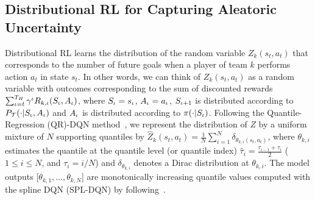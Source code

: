\documentclass{article}
\newcommand{\horizon}{T_{H}}
\newcommand{\state}{s}
\newcommand{\action}{a}
\newcommand{\transition}{t}
\newcommand{\reward}{r}
\newcommand{\agentIndex}{k}
\newcommand{\quantielIndex}{i}
\begin{document}
\subsection{Distributional RL for Capturing Aleatoric Uncertainty}\label{subsec:aleatoric-uncertainty}
Distributional RL learns the distribution of the random variable $Z_{\agentIndex}(\state_{t},\action_{t})$ that 
corresponds to the number of future goals when a player of team $k$ performs action $\action_{t}$ in state $\state_{t}$.  In other words, we can think of $Z_{\agentIndex}(\state_{t},\action_{t})$ as a random variable with outcomes corresponding to the sum of discounted rewards $\sum_{\iota=t}^{\horizon}\gamma^{\iota}\MakeUppercase{R}_{\agentIndex,\iota}(\MakeUppercase{\state}_\iota,\MakeUppercase{\action}_\iota)$, where $\MakeUppercase{\state}_\iota=\state_{\iota}$, $\MakeUppercase{\action}_\iota=\action_{\iota}$,
$\MakeUppercase{\state}_{\iota+1}$ is distributed according to $P_{\mathcal{\MakeUppercase{\transition}}}(\cdot|\MakeUppercase{\state}_\iota,\MakeUppercase{\action}_\iota)$ and $\MakeUppercase{\action}_\iota$ is distributed according to $\pi(\cdot|\MakeUppercase{\state}_\iota)$. 
Following the Quantile-Regression (QR)-DQN method~\cite{bellemare2017distributional}, we represent the distribution of $Z$ by a uniform mixture of $N$ supporting quantiles by
$
\hat{Z}_{\agentIndex}(\state_{t},\action_{t}) = \frac{1}{N}\sum_{\quantielIndex=1}^N \delta_{\theta_{\agentIndex,\quantielIndex}(\state_{t},\action_{t})}$, where $\theta_{\agentIndex,\quantielIndex}$ estimates the quantile at the quantile level (or quantile index) $\hat{\tau}_i=\frac{\tau_{\quantielIndex-1}+\tau_\quantielIndex}{2}$ ($1\leq \quantielIndex\leq N$, and $\tau_\quantielIndex=\quantielIndex/N$) and  $\delta_{\theta_{\agentIndex,i}}$ denotes a Dirac distribution at $\theta_{\agentIndex,\quantielIndex}$. The model outputs [$\theta_{\agentIndex,1},\dots,\theta_{\agentIndex,N}$] are monotonically increasing quantile values computed with the spline DQN (SPL-DQN) by following~\cite{luo2022distributional}.
\end{document}
